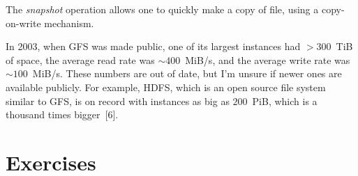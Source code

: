 The \emph{snapshot} operation allows one to quickly make a copy of file,
  using a copy-on-write mechanism.

\smallskip

In 2003, when GFS was made public,
  one of its largest instances had $>300$~TiB of space,
  the average read rate was $\sim400$~MiB/s,
  and the average write rate was $\sim100$~MiB/s.
These numbers are out of date, but I'm unsure if newer ones are available publicly.
For example, HDFS, which is an open source file system similar to GFS,
  is on record with instances as big as $200$~PiB,
  which is a thousand times bigger~[6].


\section{Exercises}

